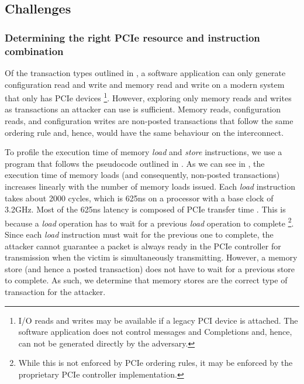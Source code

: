 \subsection{Challenges}
\label{subsec:interconnect-sc-store-ops-challenges}


\subsubsection{Determining the right PCIe resource and instruction combination}

Of the transaction types outlined in , a software application can only generate configuration read and write and memory read and write on a modern system that only has PCIe devices
\footnote{I/O reads and writes may be available if a legacy PCI device is attached.
The software application does not control messages and Completions and, hence, can not be generated directly by the adversary.}.
However, exploring only memory reads and writes as transactions an attacker can use is sufficient. 
Memory reads, configuration reads, and configuration writes are non-posted transactions that follow the same ordering rule and, hence, would have the same behaviour on the interconnect.

To profile the execution time of memory \textit{load} and \textit{store} instructions, we use a program that follows the pseudocode outlined in .
As we can see in , the execution time of memory loads (and consequently, non-posted transactions) increases linearly with the number of memory loads issued.
Each \textit{load} instruction takes about 2000 cycles, which is 625ns on a processor with a base clock of 3.2GHz.
Most of the 625ns latency is composed of PCIe transfer time \cite{neugebauer2018understanding}.
This is because a \textit{load} operation has to wait for a previous \textit{load} operation to complete 
\footnote{While this is not enforced by PCIe ordering rules, it may be enforced by the proprietary PCIe controller implementation.}.
Since each \textit{load} instruction must wait for the previous one to complete, the attacker cannot guarantee a packet is always ready in the PCIe controller for transmission when the victim is simultaneously transmitting.
However, a memory store (and hence a posted transaction) does not have to wait for a previous store to complete.
As such, we determine that memory stores are the correct type of transaction for the attacker.

